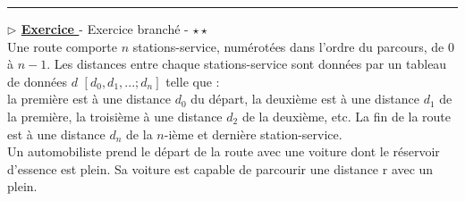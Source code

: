 \documentclass[12pt,french]{article}
\newcounter{npb}
\newcommand{\exo}{
    \stepcounter{npb}
    {\textbf{$\triangleright$ \underline{Exercice \arabic{npb} }}}
}
\begin{document}
\hrule\exo  - Exercice branché - $\star\star$ \\
Une route comporte $n$ stations-service, numérotées dans l'ordre du parcours, de 0 à $n-1$. Les distances entre chaque stations-service sont données par un tableau de données $d$ $[d_0,d_1, ...; d_n]$ telle que : \\
la première est à une distance $d_0$ du départ, la deuxième est à une distance $d_1$ de la première, la troisième à une distance $d_2$ de la deuxième, etc. La fin de la route est à une distance $d_n$ de la $n$-ième et dernière station-service.\\
Un automobiliste prend le départ de la route avec une voiture dont le réservoir d'essence est plein.
Sa voiture est capable de parcourir une distance r avec un plein.
\end{document}
